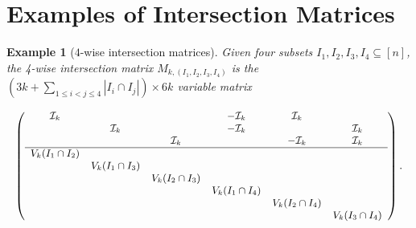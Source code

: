 \documentclass[11pt]{article}
\newtheorem{example}[theorem]{Example}
\begin{document}
\section{Examples of Intersection Matrices}
\label{app:1}

\begin{example}[$4$-wise intersection matrices]\label{example-1}
Given four subsets $I_1,I_2,I_3,I_4\subseteq [n]$, the 4-wise intersection matrix $M_{k,(I_1,I_2,I_3,I_4)}$ is the  $(3k+\sum_{
1\le i<j\le 4}|I_i\cap I_j|)\times 6k$ variable matrix

\begin{equation*}\label{4-int-matrix-rep-1}
{\small\left(
  \begin{array}{cccccc}
    \mathcal{I}_k &      &     & -\mathcal{I}_k   & \mathcal{I}_k &  \\
        &  \mathcal{I}_k &     & -\mathcal{I}_k   &     & \mathcal{I}_k \\
        &      & \mathcal{I}_k &       & -\mathcal{I}_k & \mathcal{I}_k \\\hline
    V_k(I_1\cap I_2) &  &  &  &  &  \\
     & V_k(I_1\cap I_3) &  &  &  &  \\
     &  & V_k(I_2\cap I_3) &  &  &  \\
     &  &  & V_k(I_1\cap I_4) &  &  \\
     &  &  &  & V_k(I_2\cap I_4) &  \\
     &  &  &  &  & V_k(I_3\cap I_4) \\
  \end{array}
\right).}
\end{equation*}
\end{example}
\end{document}
